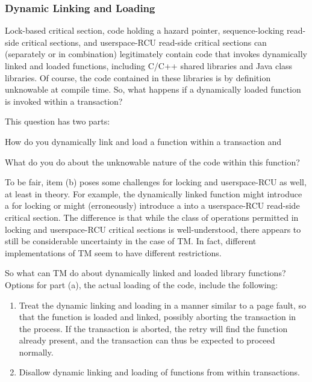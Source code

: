 \subsubsection{Dynamic Linking and Loading}
\label{sec:future:Dynamic Linking and Loading}

Lock-based critical section, code holding a hazard pointer,
sequence-locking read-side critical sections, and userspace-RCU read-side
critical sections can (separately or in combination) legitimately contain
code that invokes dynamically linked and loaded functions, including C/C++
shared libraries and Java class libraries.
Of course, the code contained in these libraries is by definition
unknowable at compile time.
So, what happens if a dynamically loaded function is invoked within
a transaction?

This question has two parts:
\begin{enumerate*}[(a)]
\item How do you dynamically link and load a function within a transaction
and
\item What do you do about the unknowable nature of the code within
this function?
\end{enumerate*}
To be fair, item (b) poses some challenges for locking and userspace-RCU
as well, at least in theory.
For example, the dynamically linked function might introduce a 
for locking or might (erroneously) introduce a  into a
userspace-RCU read-side critical section.
The difference is that while the class of operations permitted in locking
and userspace-RCU critical sections is well-understood, there appears
to still be considerable uncertainty in the case of TM\@.
In fact, different implementations of TM seem to have different restrictions.

So what can TM do about dynamically linked and loaded library functions?
Options for part (a), the actual loading of the code, include the following:

\begin{enumerate}
\item	Treat the dynamic linking and loading in a manner similar to a
	page fault, so that the function is loaded and linked, possibly
	aborting the transaction in the process.
	If the transaction is aborted, the retry will find the function
	already present, and the transaction can thus be expected to
	proceed normally.
\item	Disallow dynamic linking and loading of functions from within
	transactions.
\end{enumerate}

